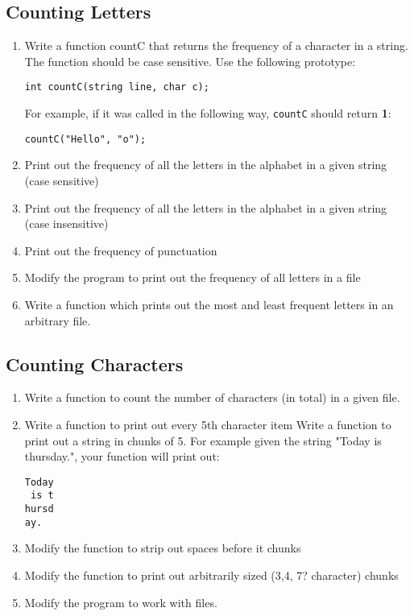 \documentclass{article}
\begin{document}
\subsection{Counting Letters}
\begin{enumerate}
\item Write a function countC that returns the frequency of a character in a string. The function should be case sensitive. Use the following prototype:
\begin{verbatim}
int countC(string line, char c);
\end{verbatim}
For example, if it was called in the following way, \texttt{countC} should return \textbf{1}:
\begin{verbatim}
countC("Hello", "o");
\end{verbatim}
\item Print out the frequency of all the letters in the alphabet in a given string (case sensitive)
\item  Print out the frequency of all the letters in the alphabet in a given string (case insensitive)
\item Print out the frequency of punctuation
\item Modify the program to print out the frequency of all letters in a file
\item Write a function which prints out the most and least frequent letters in an arbitrary file.
\end{enumerate}

\subsection{Counting Characters}
\begin{enumerate}
\item Write a function to count the number of characters (in total) in a given file. 
\item Write a function to print out every 5th character
item Write a function to print out a string in chunks of 5. For example given the string "Today is thursday.", your function will print out:
\begin{verbatim}
Today
 is t
hursd
ay.
\end{verbatim}
\item Modify the function to strip out spaces before it chunks
\item Modify the function to print out arbitrarily sized (3,4, 7? character) chunks
\item Modify the program to work with files.
\end{enumerate}
\end{document}
